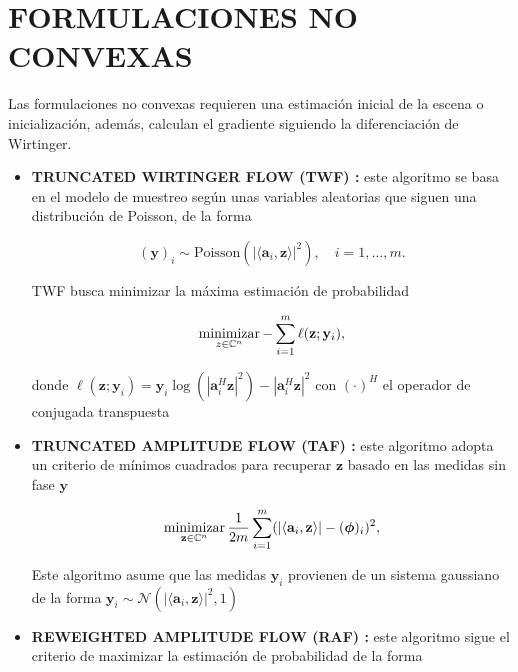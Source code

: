 \section{FORMULACIONES NO CONVEXAS}
Las formulaciones no convexas requieren una estimación inicial de la escena o inicialización, además, calculan el gradiente siguiendo la diferenciación de Wirtinger.
\begin{itemize}
    \item \textbf{TRUNCATED WIRTINGER FLOW (TWF) :} este algoritmo se basa en el modelo de muestreo según unas variables aleatorias que siguen una distribución de Poisson, de la forma
    
    \begin{equation}
        (\mathbf{y})_i\sim \mathrm{Poisson}( \vert \langle \mathbf{a}_i,\mathbf{z}\rangle \vert^2 ), \quad i=1,\dots,m.
    \end{equation}
    
    TWF busca minimizar la máxima estimación de probabilidad 
    
    \begin{equation}
        \operatorname*{minimizar}_{z \in \mathbb{C}^{n}} - \sum_{i=1}^{m} \ell(\mathbf{z};\mathbf{y}_i),
    \end{equation}
    
    donde $\ell(\mathbf{z};\mathbf{y}_i) = { \mathbf{y}_i\log(|\mathbf{a}_i^H \mathbf{z}|^2) -|\mathbf{a}_i^H \mathbf{z}|^2 }$ con $(\cdot)^H$ el operador de conjugada transpuesta
    
    \item \textbf{TRUNCATED AMPLITUDE FLOW (TAF) :} este algoritmo adopta un criterio de mínimos cuadrados para recuperar $\mathbf{z}$ basado en las medidas sin fase $\mathbf{y}$ 
    
    \begin{equation}
        \operatorname*{minimizar}_{\mathbf{z} \in \mathbb{C}^{n}} \frac{1}{2m} \sum_{i=1}^{m} (\vert \langle \mathbf{a}_i,\mathbf{z}\rangle \vert - (\boldsymbol{\phi})_i)^2,
    \end{equation}
    
    Este algoritmo asume que las medidas $\mathbf{y}_i$ provienen de un sistema gaussiano de la forma $\mathbf{y}_i \sim \mathcal{N}(\vert \langle \mathbf{a}_i,\mathbf{z}\rangle \vert^2, 1)$
    
    \item \textbf{REWEIGHTED AMPLITUDE FLOW (RAF) :} este algoritmo sigue el criterio de maximizar la estimación de probabilidad de la forma
    

\end{itemize}
